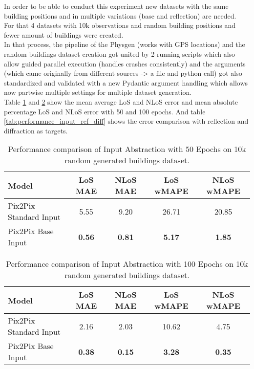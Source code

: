 		In order to be able to conduct this experiment new datasets with the same building positions and in multiple variations (base and reflection) are needed. \\For that 4 datasets with 10k observations and random building positions and fewer amount of buildings were created.\\
		In that process, the pipeline of the Physgen (works with GPS locations) and the random buildings dataset creation got united by 2 running scripts which also allow guided parallel execution (handles crashes consistently) and the arguments (which came originally from different sources -> a file and python call) got also standardized and validated with a new Pydantic \cite{pydantic} argument handling which allows now partwise multiple settings for multiple dataset generation.\\
		Table \ref{tab:performance_input_50} and \ref{tab:performance_input_100} show the mean average LoS and NLoS error and mean absolute percentage LoS and NLoS error with 50 and 100 epochs. And table \ref{tab:performance_input_ref_diff} shows the error comparison with reflection and diffraction as targets.
		
		\begin{table}[h!]
			\centering
			\begin{tabular}{|l|c|c|c|c|}
				\hline
				\textbf{Model} & \textbf{LoS MAE} & \textbf{NLoS MAE} & \textbf{LoS wMAPE} & \textbf{NLoS wMAPE} \\
				\hline
				Pix2Pix Standard Input & 5.55 & 9.20 & 26.71 & 20.85 \\
				Pix2Pix Base Input & \textbf{0.56} & \textbf{0.81} & \textbf{5.17} & \textbf{1.85} \\
				\hline
			\end{tabular}
			\caption{Performance comparison of Input Abstraction with 50 Epochs on 10k random generated buildings dataset.}
			\label{tab:performance_input_50}
		\end{table}
		
		\begin{table}[h!]
			\centering
			\begin{tabular}{|l|c|c|c|c|}
				\hline
				\textbf{Model} & \textbf{LoS MAE} & \textbf{NLoS MAE} & \textbf{LoS wMAPE} & \textbf{NLoS wMAPE} \\
				\hline
				Pix2Pix Standard Input & 2.16 & 2.03 & 10.62 & 4.75 \\
				Pix2Pix Base Input & \textbf{0.38} & \textbf{0.15} & \textbf{3.28} & \textbf{0.35} \\
				\hline
			\end{tabular}
			\caption{Performance comparison of Input Abstraction with 100 Epochs on 10k random generated buildings dataset.}
			\label{tab:performance_input_100}
		\end{table}
		
